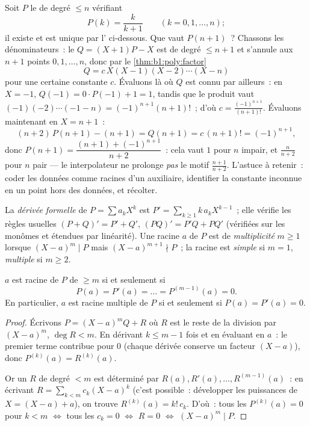 \begin{example}\label{ex:b1:poly:auxiliary}
Soit $P$ le  de degré $\leq n$ vérifiant
\[
P(k) = \frac{k}{k+1} \qquad (k = 0, 1, \dots, n) ;
\]
il existe et est unique par l' ci-dessous.
Que vaut $P(n+1)$~? Chassons les dénominateurs~: le  $Q =
(X+1)P - X$ est de degré $\leq n + 1$ et s'annule aux $n + 1$ points
$0, 1, \dots, n$, donc par le \cref{thm:b1:poly:factor}
\[
Q = c\,X(X-1)(X-2)\cdots(X-n)
\]
pour une certaine constante $c$. Évaluons là où $Q$ est connu par
ailleurs~: en $X = -1$, $Q(-1) = 0 \cdot P(-1) + 1 = 1$, tandis que
le produit vaut $(-1)(-2)\cdots(-1-n) = (-1)^{n+1}(n+1)!$~; d'où $c
= \frac{(-1)^{n+1}}{(n+1)!}$. Évaluons maintenant en $X = n + 1$~:
\[
(n+2)\,P(n+1) - (n+1) = Q(n+1) = c\,(n+1)! = (-1)^{n+1} ,
\]
donc $P(n+1) = \dfrac{(n+1) + (-1)^{n+1}}{n+2}$~: cela vaut $1$ pour
$n$ impair, et $\frac{n}{n+2}$ pour $n$ pair --- le 
interpolateur ne prolonge \emph{pas} le motif $\frac{n+1}{n+2}$.
L'astuce à retenir~: coder les données comme racines d'un 
auxiliaire, identifier la constante inconnue en un point hors des
données, et récolter.
\end{example}

\begin{definition}\label{def:b1:poly:derivative}
La \emph{dérivée formelle} de $P = \sum a_k X^k$ est $P' = \sum_{k
\geq 1} k\,a_k X^{k-1}$~; elle vérifie les règles usuelles $(P+Q)' = P'
+ Q'$, $(PQ)' = P'Q + PQ'$ (vérifiées sur les monômes et étendues par
linéarité). Une racine $a$ de $P$ est de
\emph{multiplicité} $m \geq 1$ lorsque
$(X-a)^m \mid P$ mais $(X-a)^{m+1} \nmid P$~; la racine est
\emph{simple} si $m = 1$, \emph{multiple} si $m \geq 2$.
\end{definition}

\begin{proposition}\label{prop:b1:poly:multiplicity}
$a$ est racine de $P$ de  $\geq m$ si et seulement si
\[
P(a) = P'(a) = \dots = P^{(m-1)}(a) = 0 .
\]
En particulier, $a$ est racine multiple de $P$ si et seulement si $P(a)
= P'(a) = 0$.
\end{proposition}

\begin{proof}
Écrivons $P = (X - a)^m Q + R$ où $R$ est le reste de la division par
$(X-a)^m$, $\deg R < m$. En dérivant $k \leq m - 1$ fois et en évaluant
en $a$~: le premier terme contribue pour $0$ (chaque dérivée conserve
un facteur $(X-a)$), donc $P^{(k)}(a) = R^{(k)}(a)$.

Or un  $R$ de degré $< m$ est déterminé par $R(a), R'(a),
\dots, R^{(m-1)}(a)$~: en écrivant $R = \sum_{k < m} c_k (X - a)^k$
(c'est possible~: développer les puissances de $X = (X - a) + a$), on
trouve $R^{(k)}(a) = k!\, c_k$. D'où~: tous les $P^{(k)}(a) = 0$ pour
$k < m$ $\iff$ tous les $c_k = 0$ $\iff$ $R = 0$ $\iff$ $(X-a)^m \mid
P$.
\end{proof}

